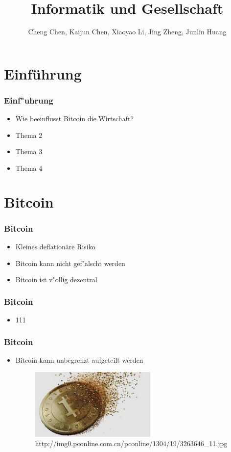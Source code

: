 \documentclass[ddcfooter]{tudbeamer}
\begin{document}
\title[Informatik und Gesellschaft]{Informatik und Gesellschaft}
\author{Cheng Chen, Kaijun Chen, Xiaoyao Li, Jing Zheng, Junlin Huang}
\maketitle

\section{Einführung}
\begin{frame}
\frametitle{Einf"uhrung}
\begin{itemize}
\item Wie beeinflusst Bitcoin die Wirtschaft?
\item Thema 2
\item Thema 3
\item Thema 4
\end{itemize}
\end{frame}

\section{Bitcoin}

\begin{frame}
\frametitle{Bitcoin}
\begin{itemize}
\item Kleines deflationäre Risiko
\item Bitcoin kann nicht gef"alscht werden
\item Bitcoin ist v"ollig dezentral
\end{itemize}
\end{frame}

\begin{frame}
\frametitle{Bitcoin}
\begin{itemize}
\item 111
\end{itemize}
\end{frame}

\begin{frame}
\frametitle{Bitcoin}
\begin{itemize}
\item Bitcoin kann unbegrenzt aufgeteilt werden
\begin{figure}
\centering
\includegraphics[height=3.5cm]{images/bitcoin_split}
\\http://img0.pconline.com.cn/pconline/1304/19/3263646\_11.jpg
\end{figure}

\end{itemize}
\end{frame}
\end{document}
